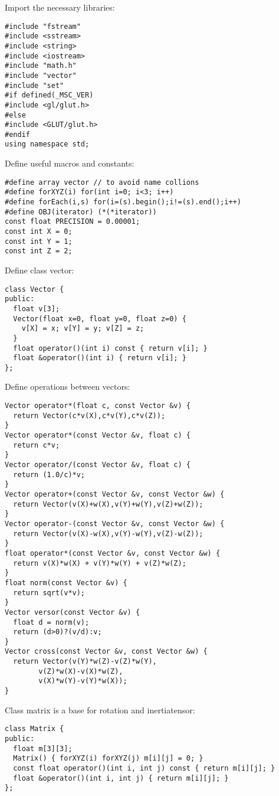 \noindent
Import the necessary libraries: \begin{lstlisting}
#include "fstream"
#include <sstream>
#include <string>
#include <iostream>
#include "math.h"
#include "vector"
#include "set"
#if defined(_MSC_VER)
#include <gl/glut.h>
#else
#include <GLUT/glut.h>
#endif
using namespace std;
\end{lstlisting}
\noindent
Define useful macros and constants: \begin{lstlisting}
#define array vector // to avoid name collions
#define forXYZ(i) for(int i=0; i<3; i++)
#define forEach(i,s) for(i=(s).begin();i!=(s).end();i++)
#define OBJ(iterator) (*(*iterator))
const float PRECISION = 0.00001;
const int X = 0;
const int Y = 1;
const int Z = 2;
\end{lstlisting}
\noindent
Define class vector: \begin{lstlisting}
class Vector {
public:
  float v[3];
  Vector(float x=0, float y=0, float z=0) {
    v[X] = x; v[Y] = y; v[Z] = z;
  }
  float operator()(int i) const { return v[i]; }
  float &operator()(int i) { return v[i]; }
};
\end{lstlisting}
\noindent
Define operations between vectors: \begin{lstlisting}
Vector operator*(float c, const Vector &v) {
  return Vector(c*v(X),c*v(Y),c*v(Z));
}
Vector operator*(const Vector &v, float c) {
  return c*v;
}
Vector operator/(const Vector &v, float c) {
  return (1.0/c)*v;
}
Vector operator+(const Vector &v, const Vector &w) {
  return Vector(v(X)+w(X),v(Y)+w(Y),v(Z)+w(Z));
}
Vector operator-(const Vector &v, const Vector &w) {
  return Vector(v(X)-w(X),v(Y)-w(Y),v(Z)-w(Z));
}
float operator*(const Vector &v, const Vector &w) {
  return v(X)*w(X) + v(Y)*w(Y) + v(Z)*w(Z);
}
float norm(const Vector &v) {
  return sqrt(v*v);
}
Vector versor(const Vector &v) {
  float d = norm(v);
  return (d>0)?(v/d):v;
}
Vector cross(const Vector &v, const Vector &w) {
  return Vector(v(Y)*w(Z)-v(Z)*w(Y),
		v(Z)*w(X)-v(X)*w(Z),
		v(X)*w(Y)-v(Y)*w(X));
}
\end{lstlisting}
\noindent
Class matrix is a base for rotation and inertiatensor: \begin{lstlisting}
class Matrix {
public:
  float m[3][3];
  Matrix() { forXYZ(i) forXYZ(j) m[i][j] = 0; }
  const float operator()(int i, int j) const { return m[i][j]; }
  float &operator()(int i, int j) { return m[i][j]; }
};
\end{lstlisting}
\noindent
